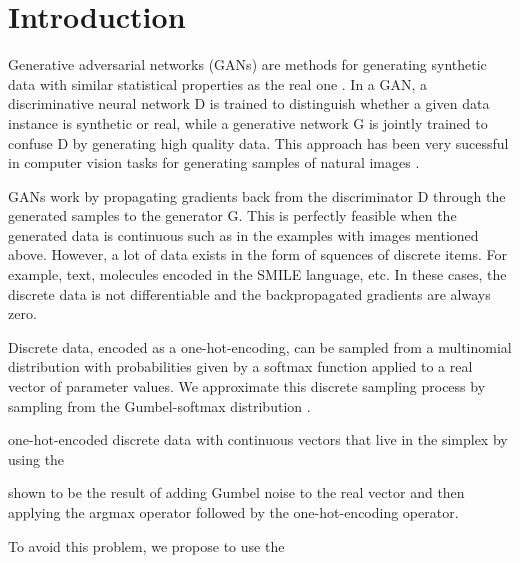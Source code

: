 \section{Introduction}

Generative adversarial networks (GANs) are methods for generating synthetic
data with similar statistical properties as the real one
\cite{goodfellow2014generative}. In a GAN, a discriminative neural network D is
trained to distinguish whether a given data instance is synthetic or real,
while a generative network G is jointly trained to confuse D by generating high
quality data. This approach has been very sucessful in computer vision tasks for
generating samples of natural images
\cite{denton2015deep,dosovitskiy2016generating,radford2016}.

GANs work by propagating gradients back from the discriminator D through the
generated samples to the generator G. This is perfectly feasible when the
generated data is continuous such as in the examples with images mentioned
above. However, a lot of data exists in the form of squences of discrete items.
For example, text, molecules encoded in the SMILE language, etc. In these
cases, the discrete data is not differentiable and the backpropagated gradients
are always zero. 

Discrete data, encoded as a one-hot-encoding, can be sampled from a multinomial
distribution with probabilities given by a softmax function applied to a real
vector of parameter values. We approximate this discrete sampling process
by sampling from the Gumbel-softmax distribution \cite{jang2016categorical}.

one-hot-encoded discrete data with
continuous vectors that live in the simplex by using the 

shown to be the result of
adding Gumbel noise to the real vector and then applying the argmax operator
followed by the one-hot-encoding operator.


To avoid this problem, we propose to use the 

